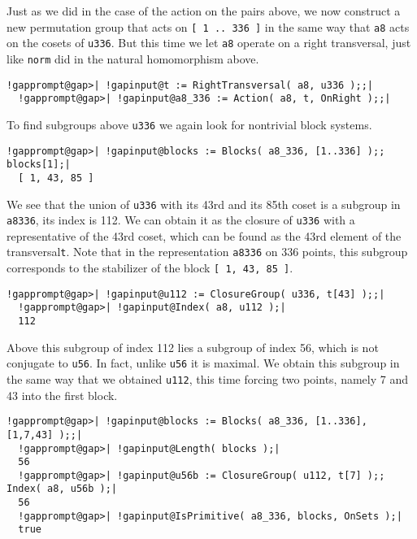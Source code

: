\documentclass[a4paper,11pt]{report}
\begin{document}
{{ Just as we did in the case of the action on the pairs above, we now construct
a new permutation group that acts on \texttt{[ 1 .. 336 ]} in the same way that \texttt{a8} acts on the cosets of \texttt{u336}. But this time we let \texttt{a8} operate on a right transversal, just like \texttt{norm} did in the natural homomorphism above. 

 
\begin{Verbatim}[commandchars=!@|,fontsize=\small,frame=single,label=Example]
  !gapprompt@gap>| !gapinput@t := RightTransversal( a8, u336 );;|
  !gapprompt@gap>| !gapinput@a8_336 := Action( a8, t, OnRight );;|
\end{Verbatim}
 

 To find subgroups above \texttt{u336} we again look for nontrivial block systems. 

 
\begin{Verbatim}[commandchars=!@|,fontsize=\small,frame=single,label=Example]
  !gapprompt@gap>| !gapinput@blocks := Blocks( a8_336, [1..336] );; blocks[1];|
  [ 1, 43, 85 ]
\end{Verbatim}
 

 We see that the union of \texttt{u336} with its 43rd and its 85th coset is a subgroup in \texttt{a8{\textunderscore}336}, its index is 112. We can obtain it as the closure of \texttt{u336} with a representative of the 43rd coset, which can be found as the 43rd
element of the transversal{\nobreakspace}\texttt{t}. Note that in the representation \texttt{a8{\textunderscore}336} on 336 points, this subgroup corresponds to the stabilizer of the block \texttt{[ 1, 43, 85 ]}. 

 
\begin{Verbatim}[commandchars=!@|,fontsize=\small,frame=single,label=Example]
  !gapprompt@gap>| !gapinput@u112 := ClosureGroup( u336, t[43] );;|
  !gapprompt@gap>| !gapinput@Index( a8, u112 );|
  112
\end{Verbatim}
 

 Above this subgroup of index 112 lies a subgroup of index 56, which is not
conjugate to \texttt{u56}. In fact, unlike \texttt{u56} it is maximal. We obtain this subgroup in the same way that we obtained \texttt{u112}, this time forcing two points, namely 7 and 43 into the first block. 

 
\begin{Verbatim}[commandchars=!@|,fontsize=\small,frame=single,label=Example]
  !gapprompt@gap>| !gapinput@blocks := Blocks( a8_336, [1..336], [1,7,43] );;|
  !gapprompt@gap>| !gapinput@Length( blocks );|
  56
  !gapprompt@gap>| !gapinput@u56b := ClosureGroup( u112, t[7] );; Index( a8, u56b );|
  56
  !gapprompt@gap>| !gapinput@IsPrimitive( a8_336, blocks, OnSets );|
  true
\end{Verbatim}
 

}}
\end{document}

